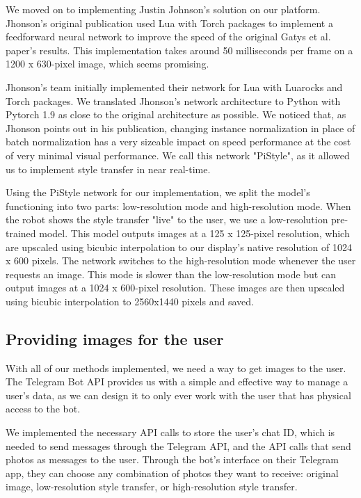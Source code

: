 We moved on to implementing Justin Johnson's solution on our platform. Jhonson's original publication used Lua with Torch packages to implement a feedforward neural network to improve the speed of the original Gatys et al. paper's results. This implementation takes around 50 milliseconds per frame on a 1200 x 630-pixel image, which seems promising. 

Jhonson's team initially implemented their network for Lua with Luarocks and Torch packages. We translated Jhonson's network architecture to Python with Pytorch 1.9 as close to the original architecture as possible. We noticed that, as Jhonson points out in his publication, changing instance normalization in place of batch normalization has a very sizeable impact on speed performance at the cost of very minimal visual performance. We call this network "PiStyle", as it allowed us to implement style transfer in near real-time.


Using the PiStyle network for our implementation, we split the model's functioning into two parts: low-resolution mode and high-resolution mode. When the robot shows the style transfer "live" to the user, we use a low-resolution pre-trained model. This model outputs images at a 125 x 125-pixel resolution, which are upscaled using bicubic interpolation to our display's native resolution of 1024 x 600 pixels. The network switches to the high-resolution mode whenever the user requests an image. This mode is slower than the low-resolution mode but can output images at a 1024 x 600-pixel resolution. These images are then upscaled using bicubic interpolation to 2560x1440 pixels and saved.

\subsection{Providing images for the user}

With all of our methods implemented, we need a way to get images to the user. The Telegram Bot API provides us with a simple and effective way to manage a user's data, as we can design it to only ever work with the user that has physical access to the bot. 

We implemented the necessary API calls to store the user's chat ID, which is needed to send messages through the Telegram API, and the API calls that send photos as messages to the user. Through the bot's interface on their Telegram app, they can choose any combination of photos they want to receive: original image, low-resolution style transfer, or high-resolution style transfer.


